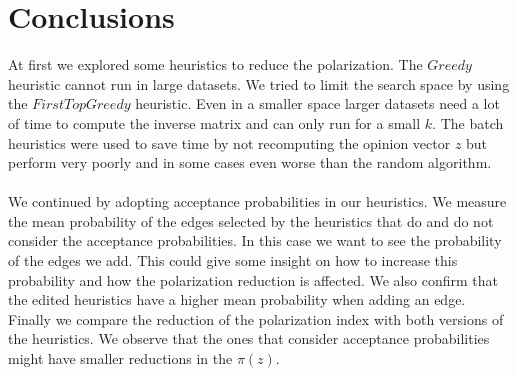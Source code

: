 \chapter{Conclusions}
\label{ch:conclusions}


At first we explored some heuristics to reduce the polarization. The $Greedy$ heuristic cannot run in large datasets. We tried to limit the search space by using the $FirstTopGreedy$ heuristic. Even in a smaller space larger datasets need a lot of time to compute the inverse matrix and can only run for a small $k$. The batch heuristics were used to save time by not recomputing the opinion vector $z$ but perform very poorly and in some cases even worse than the random algorithm.
\\
\\
We continued by adopting acceptance probabilities in our heuristics. We measure the mean probability of the edges selected by the heuristics that do and do not consider the acceptance probabilities. In this case we want to see the probability of the edges we add. This could give some insight on how to increase this probability and how the polarization reduction is affected. We also confirm that the edited heuristics have a higher mean probability when adding an edge. Finally we compare the reduction of the polarization index with both versions of the heuristics. We observe that the ones that consider acceptance probabilities might have smaller reductions in the $\pi(z)$.




